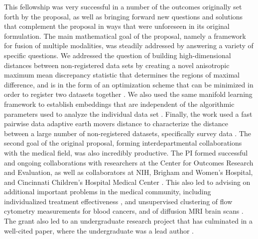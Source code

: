 This fellowship was very successful in a number of the outcomes originally set forth by the proposal, as well as bringing forward new questions and solutions that complement the proposal in ways that were unforeseen in its original formulation.  The main mathematical goal of the proposal, namely a framework for fusion of multiple modalities, was steadily addressed by answering a variety of specific questions.  We addressed the question of building high-dimensional distances between non-registered data sets by creating a novel anisotropic maximum mean discrepancy statistic that determines the regions of maximal difference, and is in the form of an optimization scheme that can be minimized in order to register two datasets together \cite{cheng2017two}.  We also used the same manifold learning framework to establish embeddings that are independent of the algorithmic parameters used to analyze the individual data set \cite{cloninger2016bigeometric,mishne2015diffusion}.  Finally, the work used a fast pairwise data adaptive earth movers distance to characterize the distance between a large number of non-registered datasets, specifically survey data \cite{cloninger2017people}.  
The second goal of the original proposal, forming interdepartmental collaborations with the medical field, was also incredibly productive.  The PI formed successful and ongoing collaborations with researchers at the Center for Outcomes Research and Evaluation, as well as collaborators at NIH, Brigham and Women's Hospital, and Cincinnati Children's Hospital Medical Center \cite{cloninger2016bigeometric,downing2017describing,cloninger2017people}.  This also led to advising on additional important problems in the medical community, including individualized treatment effectiveness \cite{cloninger2016function}, and unsupervised clustering of flow cytometry measurements for blood cancers, and of diffusion MRI brain scans \cite{cheng2017two}. The grant also led to an undergraduate research project that has culminated in a well-cited paper, where the undergraduate was a lead author \cite{katzman2016deep}.

